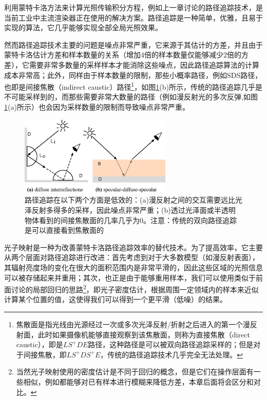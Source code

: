 利用蒙特卡洛方法来计算光照传输积分方程，例如上一章讨论的路径追踪技术，是当前工业中主流渲染器正在使用的解决方案。路径追踪是一种简单，优雅，且易于实现的算法，它几乎能够实现全部全局光照效果。

然而路径追踪技术主要的问题是噪点非常严重，它来源于其估计的方差，并且由于蒙特卡洛估计方差和样本数量的关系（增加4倍的样本数量仅能够减少2倍的方差），它需要非常多数量的采样样本才能消除这些噪点，因此路径追踪算法的计算成本非常高；此外，同样由于样本数量的限制，那些小概率路径，例如SDS路径，也即是间接焦散（indirect caustic）路径\footnote{焦散面是指光线由光源经过一次或多次光泽反射/折射之后进入的第一个漫反射面，此时如果摄像机能够直接观察到该焦散面，则称为直接焦散（direct caustic），即是$LS^{+}DE$路径，这种路径是可以被双向路径追踪采样的；但是对于间接焦散，即$LS^{+}DS^{+}E$，传统的路径追踪技术几乎完全无法处理。}，如图\ref{f:pm-photon-maps-pros}(b)所示，传统的路径追踪几乎是不可能采样到的，而那些需要非常大数量的路径（例如漫反射光的多次反弹,如图\ref{f:pm-photon-maps-pros}(a)所示）也会因为采样数量的限制而导致噪点非常严重。

\begin{figure}
	\sidecaption
	\includegraphics[width=0.65\textwidth]{figures/pm/photon-maps-pros}
	\caption{路径追踪在以下两个方面是低效的：(a)漫反射之间的交互需要远比光泽反射多得多的采样，因此噪点非常严重；(b)透过光泽面或半透明物体看到的间接焦散面的几率几乎为0。注意：传统的双向路径追踪是可以直接看到焦散面的}
	\label{f:pm-photon-maps-pros}
\end{figure}

光子映射是一种为改善蒙特卡洛路径追踪效率的替代技术。为了提高效率，它主要从两个层面对路径追踪进行改进：首先考虑到对于大多数模型（如漫反射表面），其辐射亮度场的变化在很大的面积范围内是非常平滑的，因此这些区域的光照信息可以被存储起来并重用；其次，也正是由于能够重用样本，我们可以使用类似于前面讨论的局部回归的思路\footnote{当然光子映射使用的密度估计是不同于回归的概念，但是它们在操作层面有一些相似，例如都能够对已有样本进行模糊来降低方差，本章后面将会区分和对比。}，即光子密度估计，根据周围一定领域内的样本来近似计算某个位置的值，这使得我们可以得到一个更平滑（低噪）的结果。

